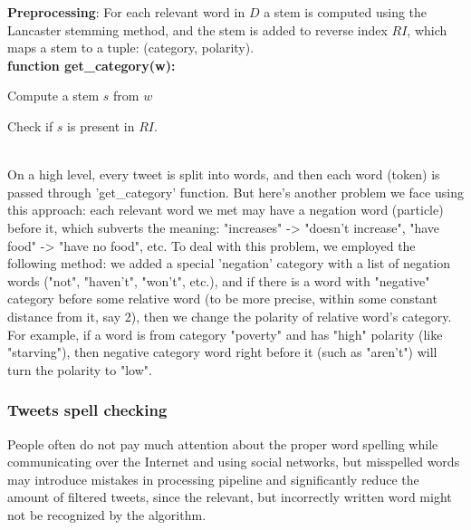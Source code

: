 \textbf{Preprocessing}: For each relevant word in $D$ a stem is computed using the Lancaster stemming method, and the stem is added to reverse index $RI$, which maps a stem to a tuple: (category, polarity). \\

\textbf{function get\_category(w):}

\indent
\begin{algorithm}[H]
Compute a stem $s$ from $w$ \par
Check if $s$ is present in $RI$.

\end{algorithm}
\noindent \\

On a high level, every tweet is split into words, and then each word (token) is passed through 'get\_category' function. But here's another problem we face using this approach: each relevant word we met may have a negation word (particle) before it, which subverts the meaning: "increases" -> "doesn't increase", "have food" -> "have no food", etc. To deal with this problem, we employed the following method: we added a special 'negation' category with a list of negation words ("not", "haven't", "won't", etc.), and if there is a word with "negative" category before some relative word (to be more precise, within some constant distance from it, say 2), then we change the polarity of relative word's category. For example, if a word is from category "poverty" and has "high" polarity (like "starving"), then negative category word right before it (such as "aren't") will turn the polarity to "low".

\subsubsection*{Tweets spell checking}
People often do not pay much attention about the proper word spelling while communicating over the Internet and using social networks, but misspelled words may introduce mistakes in processing pipeline and significantly reduce the amount of filtered tweets, since the relevant, but incorrectly written word might not be recognized by the algorithm.

